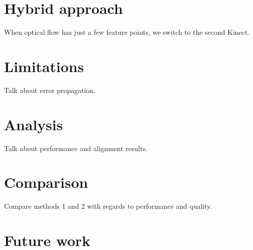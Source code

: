 \documentclass[msc, a4paper, classic, pt]{ufbathesis}
\begin{document}
\section{Hybrid approach}
When optical flow has just a few feature points, we switch to the second Kinect.

\section{Limitations}
Talk about error propagation.
\section{Analysis}
Talk about performance and alignment results.
\section{Comparison}
Compare methods 1 and 2 with regards to performance and quality.

\section{Future work}

\backmatter

\appendix

% 
% 
% 





\end{document}

